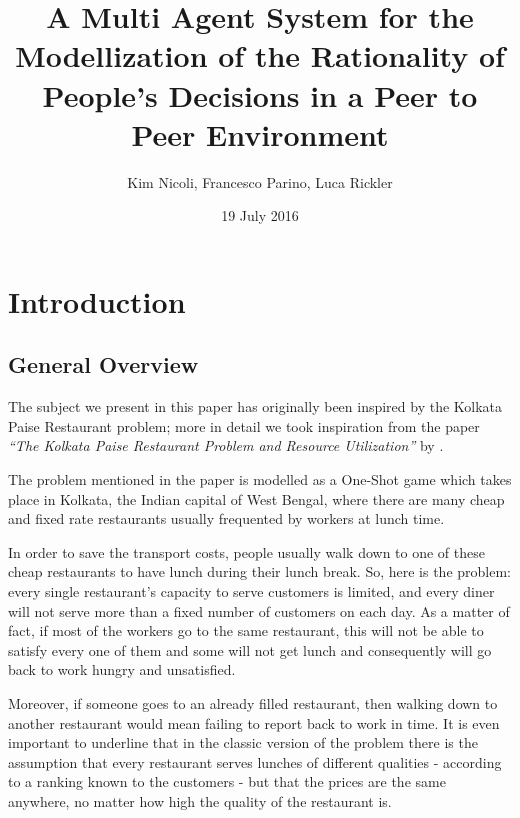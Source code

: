 \documentclass[10pt,a4paper,usenatbib]{article}
\begin{document}
\title{A Multi Agent System for the Modellization of the Rationality of People's Decisions in a Peer to Peer Environment}

\author{Kim Nicoli, Francesco Parino, Luca Rickler}
\date{19 July 2016}
\maketitle
\pagebreak

\tableofcontents

\pagebreak


\section{Introduction}


\subsection{General Overview}

The subject we present in this paper has originally been inspired
by the Kolkata Paise Restaurant problem; more in detail we took inspiration
from the paper \textit{\textquotedblleft The Kolkata Paise Restaurant
Problem and Resource Utilization\textquotedblright} by \citet{Chakrabarti2009}. 

The problem mentioned in the paper is modelled as a One-Shot game
which takes place in Kolkata, the Indian capital of West Bengal, where
there are many cheap and fixed rate restaurants usually frequented
by workers at lunch time.

In order to save the transport costs, people usually walk down to
one of these cheap restaurants to have lunch during their lunch break.
So, here is the problem: every single restaurant's capacity to serve
customers is limited, and every diner will not serve more than a fixed
number of customers on each day. As a matter of fact, if most of the
workers go to the same restaurant, this will not be able to satisfy
every one of them and some will not get lunch and consequently will
go back to work hungry and unsatisfied.

Moreover, if someone goes to an already filled restaurant, then walking
down to another restaurant would mean failing to report back to work
in time. It is even important to underline that in the classic version
of the problem there is the assumption that every restaurant serves
lunches of different qualities - according to a ranking known to the
customers - but that the prices are the same anywhere, no matter how
high the quality of the restaurant is.
\end{document}
